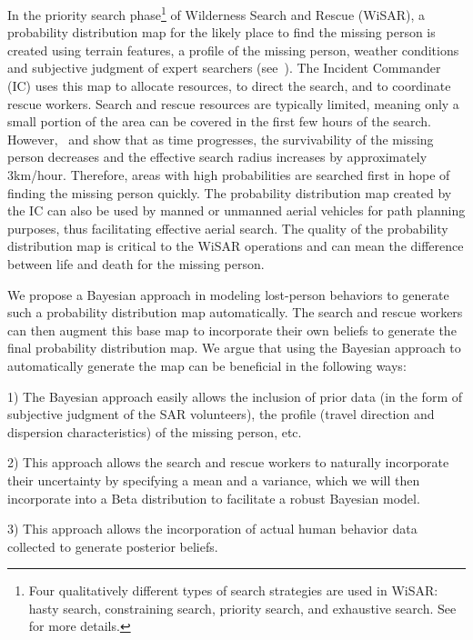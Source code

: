 In the priority search phase\footnote{Four qualitatively different types of search strategies are used in WiSAR: hasty search, constraining search, priority search, and exhaustive search. See~\cite{Goodrich2008Supporting} for more details.} of Wilderness Search and Rescue (WiSAR), a probability distribution map for the likely place to find the missing person is created using terrain features, a profile of the missing person, weather conditions and subjective judgment of expert searchers (see~\cite{Koester2008Lost}). The Incident Commander (IC) uses this map to allocate resources, to direct the search, and to coordinate rescue workers. Search and rescue resources are typically limited, meaning only a small portion of the area can be covered in the first few hours of the search. However,~\cite{Setnicka1980Wilderness} and \cite{Syrotuck2000Introduction} show that as time progresses, the survivability of the missing person decreases and the effective search radius increases by approximately 3km/hour. Therefore, areas with high probabilities are searched first in hope of finding the missing person quickly. The probability distribution map created by the IC can also be used by manned or unmanned aerial vehicles for path planning purposes, thus facilitating effective aerial search. The quality of the probability distribution map is critical to the WiSAR operations and can mean the difference between life and death for the missing person.

We propose a Bayesian approach in modeling lost-person behaviors to generate such a probability distribution map automatically. The search and rescue workers can then augment this base map to incorporate their own beliefs to generate the final probability distribution map. We argue that using the Bayesian approach to automatically generate the map can be beneficial in the following ways: 

1) The Bayesian approach easily allows the inclusion of prior data (in the form of subjective judgment of the SAR volunteers), the profile (travel direction and dispersion characteristics) of the missing person, etc.

2) This approach allows the search and rescue workers to naturally incorporate their uncertainty by specifying a mean and a variance, which we will then incorporate into a Beta distribution to facilitate a robust Bayesian model.

3) This approach allows the incorporation of actual human behavior data collected to generate posterior beliefs.

